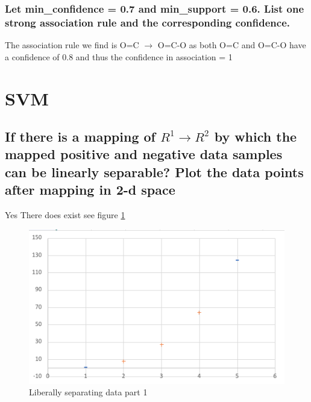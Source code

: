 \documentclass[11pt]{article}
\begin{document}
\subsubsection{Let min\_confidence = 0.7 and min\_support = 0.6. List one strong association rule and the corresponding confidence. }
The association rule we find is O=C $\longrightarrow$ O=C-O as both O=C and O=C-O have a confidence of 0.8 and thus the confidence in association = 1
\section{SVM}
\subsection{If there is a mapping of $R^1 \rightarrow R^2$ by which the mapped positive and negative data samples can be linearly separable? Plot the data points after mapping in 2-d space}
Yes There does exist see figure \ref{fig:svm1}
\begin{figure}[]
\centering
\includegraphics[width=12cm]{Assignments/MidTerm/svmpart1.png}
\caption{Liberally separating data part 1}
\label{fig:svm1}
\end{figure}
\end{document}
